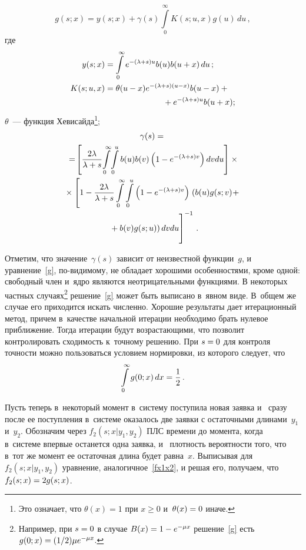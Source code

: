 \begin{multicols}{2}
\noindent
\begin{equation}
\label{g}
g(s;x)=y(s;x)+ \gamma(s) \int\limits_0^\infty K(s;u,x)g(u)\,du\,, 
\end{equation}
где 
\begin{align*}
y(s;x)&=\int\limits_{0}^\infty
e^{-(\lambda+s) u} b(u)b(u+x)\, du\,;\\
K(s;u,x)&=\theta(u-x) e^{-(\lambda+s) (u-x)} b(u-x)+ {}\\
&\hspace*{25mm}{}+e^{-(\lambda+s) u}b(u+x);
\end{align*}
$\theta$~--- функция Хевисайда\footnote{Это означает, что $\theta(x)=1$ при $x\ge 
0$ и~$\theta(x)\hm=0$ иначе.};
\begin{multline*}
\gamma(s) ={}\\
{}= %
\!\left[\fr{2\lambda}{\lambda+ s} \!\int\limits_{0}^\infty \!
\int\limits_{0}^u b(u)b(v) 
\left (1 -e^{- (\lambda+s) v}\right )dv du\right]\times{}\\ 
{}\times 
\left[1- \fr{2\lambda}{\lambda+ s}
\int\limits_{0}^\infty
\int\limits_{0}^{u}
\left (1 - e^{-(\lambda+s) v} \right)\right.
\left( b(u)g(s;v)\!+{}\right.\\
\left.\left.{}+ b(v)g(s;u) \right)
\vphantom{\int\limits_0^T }
dv du\right]^{-1}\,.
\end{multline*}

\noindent
Отметим, что значение~$\gamma(s)$ зависит от неизвестной функции~$g$,
и уравнение~\eqref{g}, по-видимому, не обладает хорошими особенностями, 
кроме одной: 
свободный член и~ядро являются неотрицательными функциями.
В некоторых частных случаях\footnote{Например, при $s\hm=0$
в случае $B(x)\hm=1-e^{-\mu x}$ решение~\eqref{g} есть 
$g(0;x)\hm=(1/2)\mu e^{-\mu x}$.}
решение~\eqref{g} может быть выписано в~явном виде. В~общем же случае его 
приходится искать численно.
Хорошие результаты дает итерационный метод, причем в~качестве начальной 
итерации
необходимо брать нулевое приближение. Тогда итерации будут возрастающими, 
что
позволит контролировать сходимость к~точному решению. При $s\hm=0$ для 
контроля точности
можно пользоваться условием нормировки, из которого следует, что 
$$
\int\limits_0^\infty g(0;x)\,dx=\displaystyle\frac{\displaystyle 1\mathstrut}{\displaystyle 2\mathstrut}\,.
$$

Пусть теперь в~некоторый момент в~систему поступила новая заявка и~
сразу после ее поступления в~системе оказалось две заявки
с остаточными длинами~$y_1$ и~$y_2$. Обозначим через $f_2(s;x|y_1,y_2)$ 
ПЛС времени до момента, когда в~системе впервые останется одна заявка, и~
плот\-ность ве\-ро\-ят\-ности того, что в~тот же момент ее остаточная длина будет 
равна~$x$.
Выписывая для $f_2(s;x|y_1,y_2)$ уравнение, аналогичное~\eqref{fx1x2},
и решая его, получаем, что $f_2(s;x)\hm=2g(s;x)$.


\end{multicols}
